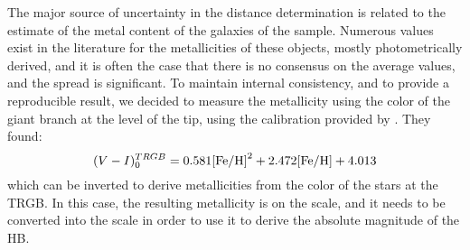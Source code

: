 \documentclass[11pt,preprint2]{aastex}
\begin{document}



The major source of uncertainty in the distance determination is related to the estimate  of the metal  content of the galaxies of the sample. Numerous values exist in the literature for the metallicities of these objects, mostly photometrically derived, and it is often the case that there is no consensus on the average values, and the spread is significant. To maintain internal consistency, and to provide a reproducible result, we decided to measure the metallicity using the color of the giant branch at the level of the tip, using the calibration provided by \citet{2001ApJ...556..635B}. They found: 
$$(V-I)_0^{TRGB}=0.581 \rm{[Fe/H]}^2 +2.472 \rm{[Fe/H]} +4.013$$
which can be inverted to derive metallicities from the color of the stars at the TRGB. In this case, the resulting metallicity is on the \cite{1984ApJS...55...45Z} scale, and it needs to be converted into the \citet{1997AAS..121...95C} scale in order to use it to derive the absolute magnitude of the HB.
\end{document}
